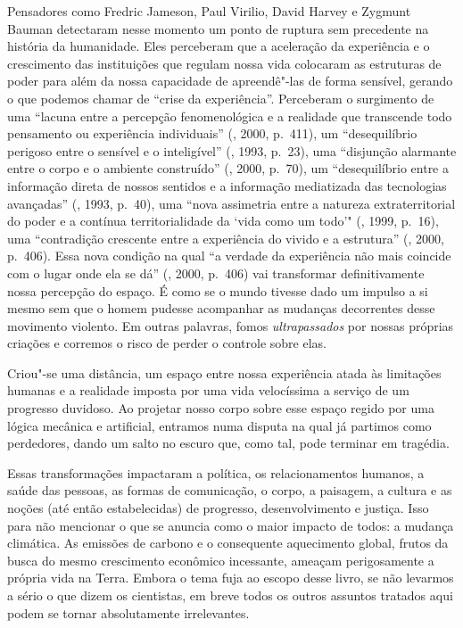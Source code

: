 Pensadores como Fredric Jameson, Paul Virilio, David Harvey e Zygmunt Bauman
detectaram nesse momento um ponto de ruptura sem precedente na história \label{ruptura}
da humanidade. Eles perceberam que a aceleração da experiência e o
crescimento das instituições que regulam nossa vida colocaram as
estruturas de poder para além da nossa capacidade de apreendê"-las de
forma sensível, gerando o que podemos chamar de ``crise da
experiência''. Perceberam o surgimento de uma ``lacuna entre a percepção
fenomenológica e a realidade que transcende todo pensamento ou
experiência individuais'' (, 2000, p.~411), um ``desequilíbrio
perigoso entre o sensível e o inteligível'' (, 1993, p.~23), uma
``disjunção alarmante entre o corpo e o ambiente construído'' (,
2000, p.~70), um ``desequilíbrio entre a informação direta de nossos
sentidos e a informação mediatizada das tecnologias avançadas''
(, 1993, p.~40), uma ``nova assimetria entre a natureza
extraterritorial do poder e a contínua territorialidade da `vida como um
todo'" (, 1999, p.~16), uma ``contradição crescente entre a
experiência do vivido e a estrutura'' (, 2000, p.~406). Essa nova
condição na qual ``a verdade da experiência não mais coincide com o lugar
onde ela se dá'' (, 2000, p.~406) vai transformar definitivamente
nossa percepção do espaço. É como se o mundo tivesse dado um impulso a
si mesmo sem que o homem pudesse acompanhar as mudanças decorrentes
desse movimento violento. Em outras palavras, fomos \emph{ultrapassados}
por nossas próprias criações e corremos o risco de perder o controle
sobre elas.

Criou"-se uma distância, um espaço entre nossa experiência atada às
limitações humanas e a realidade imposta por uma vida velocíssima a
serviço de um progresso duvidoso. Ao projetar nosso corpo sobre esse
espaço regido por uma lógica mecânica e artificial, entramos numa
disputa na qual já partimos como perdedores, dando um salto no escuro
que, como tal, pode terminar em tragédia.

Essas transformações impactaram a política, os relacionamentos humanos, a saúde
das pessoas, as formas de comunicação, o corpo, a paisagem, a cultura e
as noções (até então estabelecidas) de progresso, desenvolvimento e
justiça. Isso para não mencionar o que se anuncia como o maior impacto
de todos: a mudança climática. As emissões de carbono e o consequente
aquecimento global, frutos da busca do mesmo crescimento econômico
incessante, ameaçam perigosamente a própria vida na Terra. Embora o tema
fuja ao escopo desse livro, se não levarmos a sério o que dizem os
cientistas, em breve todos os outros assuntos tratados aqui podem se
tornar absolutamente irrelevantes.

